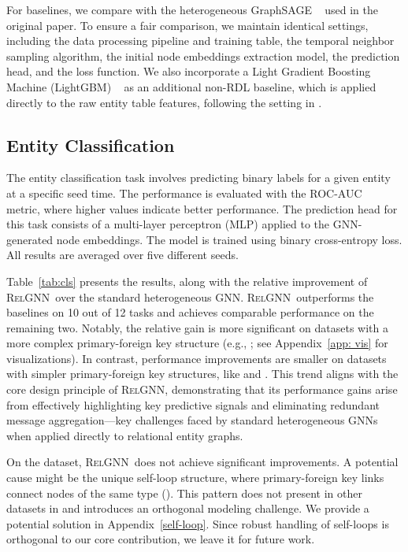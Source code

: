 \documentclass{article}
\newcommand{\method}{\textsc{RelGNN}}
\theoremstyle{plain}
\theoremstyle{definition}
\theoremstyle{remark}
\begin{document}
 For baselines, we compare with the heterogeneous GraphSAGE ~\citep{hamilton2017inductive,fey2019fast,robinson2024relbench} used in the original \relbench paper. To ensure a fair comparison, we maintain identical settings, including the data processing pipeline and training table, the temporal neighbor sampling algorithm, the initial node embeddings extraction model, the prediction head, and the loss function. We also incorporate a Light Gradient Boosting Machine (LightGBM) ~\citep{ke2017lightgbm} as an additional non-RDL baseline, which is applied directly to the raw entity table features, following the setting in \citet{robinson2024relbench}. 


\subsection{Entity Classification}
\label{sec:node_cls}

The entity classification task involves predicting binary labels for a given entity at a specific seed time. The performance is evaluated with the ROC-AUC ~\citep{hanley1983method} metric, where higher values indicate better performance. The prediction head for this task consists of a multi-layer perceptron (MLP) applied to the GNN-generated node embeddings. The model is trained using binary cross-entropy loss. All results are averaged over five different seeds.

\vspace{-5pt}
Table~\ref{tab:cls}  presents the results, along with the relative improvement of \method~over the standard heterogeneous GNN. \method~outperforms the baselines on 10 out of 12 tasks and achieves comparable performance on the remaining two. Notably, the relative gain is more significant on datasets with a more complex primary-foreign key structure (e.g., \fone; see Appendix~\ref{app: vis} for visualizations).  In contrast, performance improvements are smaller on datasets with simpler primary-foreign key structures, like \amazonn and \handm. This trend aligns with the core design principle of \method, demonstrating that its performance gains arise from effectively highlighting key predictive signals and eliminating redundant message aggregation—key challenges faced by standard heterogeneous GNNs when applied directly to relational entity graphs.

\vspace{-5pt}
 On the \stackex dataset, \method~does not achieve significant improvements. A potential cause might be the unique self-loop structure, where primary-foreign key links connect nodes of the same type (\posts). This pattern does not present in other datasets in \relbench and introduces an orthogonal modeling challenge. We provide a potential solution in Appendix~\ref{self-loop}. Since robust handling of self-loops is orthogonal to our core contribution, we leave it for future work.
\end{document}
